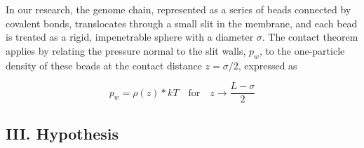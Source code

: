 \documentclass[12pt]{article}
\begin{document}
\begin{flushleft}
 
In our research, the genome chain, represented as a series of beads connected by covalent bonds, translocates through a small slit in the membrane, and each bead is treated as a rigid, impenetrable sphere with a diameter $ \sigma $. The contact theorem\cite{Voertler1997} applies by relating the pressure normal to the slit walls, $ p_w $, to the one-particle density of these beads at the contact distance $ z = \sigma/2 $, expressed as 


\begin{equation}
{p_w}= \rho(z) *kT \quad \text{for} \quad z \to \frac{L - \sigma}{2}
\end{equation}

\subsection*{III. Hypothesis}

\end{flushleft}
\end{document}
